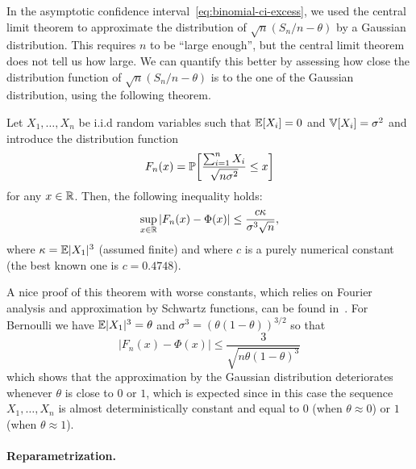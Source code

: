 In the asymptotic confidence interval~\eqref{eq:binomial-ci-excess}, we used the central limit theorem to approximate the distribution of $\sqrt n(S_n / n - \theta)$ by a Gaussian distribution.
This requires $n$ to be ``large enough'', but the central limit theorem does not tell us how large.
We can quantify this better by assessing how close the distribution function of $\sqrt n(S_n / n - \theta)$ is to the one of the Gaussian distribution, using the following theorem.
\begin{theorem}
	\label{thm:berry-esseen}
	Let $X_1, \ldots, X_n$ be i.i.d random variables such that $\E [X_i] = 0$ and $\var[X_i] = \sigma^2$ and introduce the distribution function%
	\begin{equation*}
		F_n(x) = \P \bigg[ \frac{\sum_{i=1}^n X_i}{\sqrt{n \sigma^2}} \leq x \bigg]
	\end{equation*}
	for any $x \in \R$. Then, the following inequality holds:
	\begin{equation*}
		\sup_{x \in \R} |F_n(x) - \Phi(x)| \leq \frac{c \kappa}{\sigma^3 \sqrt n},
	\end{equation*}
	where $\kappa = \E |X_1|^3$ (assumed finite) and where $c$ is a purely numerical constant (the best known one is $c = 0.4748$).
\end{theorem}

A nice proof of this theorem with worse constants, which relies on Fourier analysis and approximation by Schwartz functions, can be found in~.
For Bernoulli we have $\E|X_1|^3 = \theta$ and $\sigma^3 = (\theta(1 - \theta))^{3/2}$ so that 
\begin{equation*}
	|F_n(x) - \Phi(x)| \leq \frac{3}{\sqrt{n \theta (1 - \theta)^3}}
\end{equation*}
which shows that the approximation by the Gaussian distribution deteriorates whenever $\theta$ is close to $0$ or $1$, which is expected since in this case the sequence $X_1, \ldots, X_n$ is almost deterministically constant and equal to $0$ (when $\theta \approx 0$) or $1$ (when $\theta \approx 1$).

\paragraph{Reparametrization.} %

